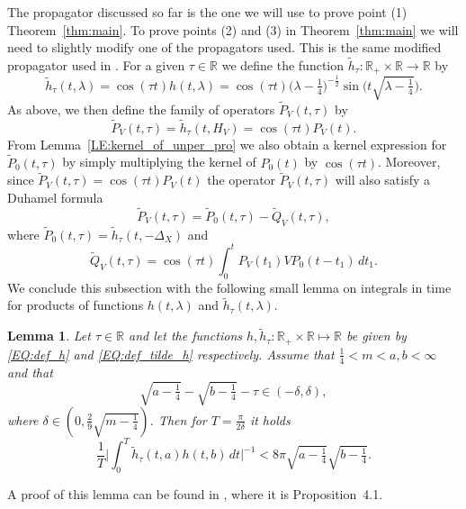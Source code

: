 \documentclass[11pt,twoside,reqno]{amsart}
\newcommand{\R}{\mathbb{R}}
\newcommand{\1}{\mathrm{\mathbf{1}}}
\numberwithin{equation}{section}
\theoremstyle{plain}
\newtheorem{lemma}[thm]{Lemma}
\theoremstyle{definition}
\theoremstyle{remark}
\begin{document}
The propagator discussed so far is the one we will use to prove point (1) Theorem~\ref{thm:main}. To prove points (2) and (3) in Theorem~\ref{thm:main} we will need to slightly modify one of the propagators used. This is the same modified propagator used in \cite{Hippi}. For a given $\tau \in \R$ we define the function $\tilde{h}_\tau \colon\R_+\times \R \to \R $ by 
\begin{equation}\label{EQ:def_tilde_h}
    \tilde{h}_{\tau}(t,\lambda) = \cos(\tau t) h(t,\lambda) = \cos(\tau t)  \big(\lambda-\tfrac{1}{4}\big)^{-\frac12}\sin\big(t\sqrt{\lambda-\tfrac14}\big).
\end{equation}
As above, we then define the family of operators $\widetilde{P}_V(t,\tau)$ by 
\begin{equation*}
    \widetilde{P}_V(t,\tau) = \tilde{h}_{\tau}(t,H_V) = \cos(\tau t) P_V(t).
\end{equation*}
From Lemma~\ref{LE:kernel_of_unper_pro} we also obtain a kernel expression for $\widetilde{P}_0(t,\tau)$ by simply multiplying the kernel of $P_0(t)$ by $\cos(\tau t)$. Moreover, since $\widetilde{P}_V(t,\tau) = \cos(\tau t) P_V(t)$ the operator $\widetilde{P}_V(t,\tau)$ will also satisfy a Duhamel formula
\begin{equation}\label{Duhamel_formula_main_tilde}
    \widetilde{P}_V(t,\tau) = \widetilde{P}_0(t,\tau) - \widetilde{Q}_V(t,\tau),
\end{equation}
where $\widetilde{P}_0(t,\tau) = \tilde{h}_\tau(t,-\Delta_X)$ and
\begin{equation}
    \widetilde{Q}_V(t,\tau) =   \cos(\tau t)\int_{0}^{t}  P_V(t_1) V P_0(t-t_1) \, dt_1.
\end{equation}
We conclude this subsection with the following small lemma on integrals in time for products of functions $h(t,\lambda)$ and $\tilde{h}_\tau(t,\lambda)$.    

\begin{lemma}\label{LE:lower_bound_tilde_h_and_h(t,lambda)}
    Let $\tau\in \R$ and let the functions $h,\tilde{h}_\tau:\R_+\times \R \mapsto \R$ be given by \eqref{EQ:def_h} and \eqref{EQ:def_tilde_h} respectively. Assume that $\frac{1}{4}<m<a,b < \infty$ and that 
    \begin{equation*}
        \sqrt{a-\tfrac14}-\sqrt{b-\tfrac{1}{4}}-\tau \in(-\delta,\delta),
    \end{equation*}
    where $\delta \in (0,\frac{2}{9}\sqrt{m-\frac14})$. Then for $T = \frac{\pi}{2\delta}$ it holds
    \begin{equation*}
        \frac{1}{T}\Bigg| \int_0^T \tilde{h}_\tau(t,a) h(t,b) \, d t \Bigg|^{-1} < 8\pi  \sqrt{a-\tfrac14}\sqrt{b-\tfrac{1}{4}}.
    \end{equation*}
\end{lemma}
A proof of this lemma can be found in \cite{Hippi}, where it is Proposition~{4.1}. 
\end{document}
